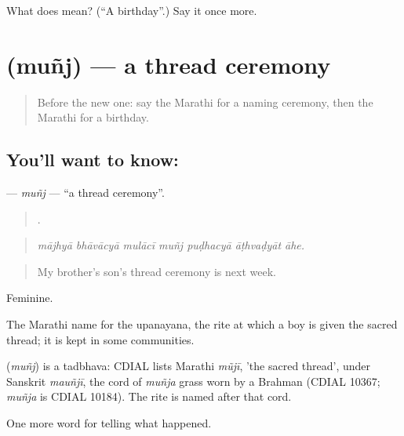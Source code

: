 \begin{tcolorbox}[breakable,colback=teal!4,colframe=teal!35!black,title={Before you move on}]
What does  mean? (\textquotedblleft{}A birthday\textquotedblright{}.) Say it once more.
\end{tcolorbox}
\section[\texorpdfstring{\mr{मुंज} (muñj)}{मुंज (muñj)}]{ (muñj) — a thread ceremony}

\label{lesson:MR-C318-munj}



\begin{quote}
Before the new one: say the Marathi for a naming ceremony, then the Marathi for a birthday.
\end{quote}

\subsection*{You'll want to know: }
\textbf{} — \emph{muñj} — \textquotedblleft{}a thread ceremony\textquotedblright{}.

\begin{quote}
      .
\end{quote}

\begin{quote}
\emph{mājhyā bhāvācyā mulācī muñj puḍhacyā āṭhvaḍyāt āhe.}
\end{quote}

\begin{quote}
My brother's son's thread ceremony is next week.
\end{quote}

Feminine.

The Marathi name for the upanayana, the rite at which a boy is given the sacred thread; it is kept in some communities.

\begin{cousinweb}
\textbf{} (\emph{muñj}) is a tadbhava: CDIAL lists Marathi \emph{mũjī}, 'the sacred thread', under Sanskrit \emph{mauñjī}, the cord of \emph{muñja} grass worn by a Brahman (CDIAL 10367; \emph{muñja} is CDIAL 10184). The rite is named after that cord.
\end{cousinweb}

\begin{grammarlens}[title={What you've built}]
One more word for telling what happened.
\end{grammarlens}

